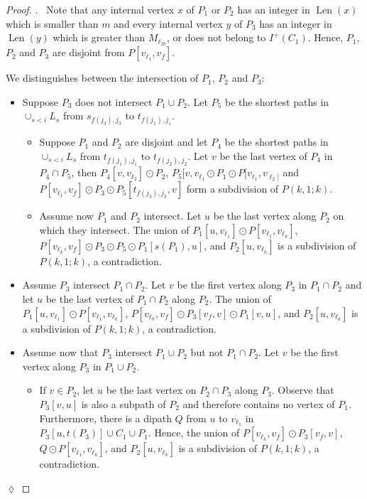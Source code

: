 \documentclass[utf8,10pt]{article}
\theoremstyle{plain}
\theoremstyle{definition}
\theoremstyle{remark}
\newenvironment{subproof}{\par\noindent {\it Subproof}.\ }{\hfill$\lozenge$\par\vspace{11pt}}
\DeclareMathOperator{\Len}{Len}
\begin{document}
\begin{proof}
\begin{subproof}
Note that any internal vertex $x$ of $P_1$ or $P_2$ has an integer in $\Len(x)$
which is smaller than $m$ and every internal vertex $y$ of $P_3$ has an integer in $\Len(y)$ which
is greater than $M_{\ell_{2k}}$, or does not belong to $I^+(C_1)$. Hence, 
$P_1$, $P_2$ and $P_3$ are disjoint from $P[v_{\ell_1},v_f]$. 

We distinguishes between the intersection of $P_1$, $P_2$ and $P_3$:

\begin{itemize}
	\item Suppose $P_3$ does not intersect $P_1 \cup P_2$. Let $P_5$ be the shortest paths in $\cup_{s < i} L_s$ from $s_{f(j_3),j_3}$ to $t_{f(j_1),j_1}$.
	\begin{itemize}
		\item Suppose $P_1$ and $P_2$ are disjoint and let $P_4$ be the shortest paths in $\cup_{s < i} L_s$ 
from $t_{f(j_1),j_1}$ to $t_{f(j_2),j_2}$. Let $v$ be the last vertex of $P_4$ in $P_4 \cap P_5$, then $P_4[v,v_{\ell_2}] \odot P_2$,
$P_5[v, v_{\ell_1} \odot P_1 \odot P[v_{\ell_1}, v_{\ell_2]}$ and $P[v_{\ell_1}, v_f] \odot P_3 \odot P_5[t_{f(j_3),j_3}, v]$
form a subdivision of $P(k,1;k)$.
	
		\item Assume now $P_1$ and $P_2$ intersect. Let $u$ be the last vertex along $P_2$ on which they intersect.
		 The union of $P_1[u,v_{\ell_1}]\odot P[v_{\ell_1}, v_{\ell_k}]$, $P[v_{\ell_k}, v_f]\odot P_3\odot P_5 \odot P_1[s(P_1), u]$, and $P_2[u, v_{\ell_k}]$ is a subdivision of $P(k,1;k)$, a contradiction.
	\end{itemize}

	\item Assume $P_3$ intersect $P_1\cap P_2$. Let $v$ be the first vertex along $P_3$ in $P_1\cap P_2$ and let $u$ be the last vertex of $P_1\cap P_2$ along $P_2$. The union of $P_1[u,v_{\ell_1}]\odot P[v_{\ell_1}, v_{\ell_k}]$, $P[v_{\ell_k}, v_f]\odot P_3[v_f,v]\odot P_1[v, u]$, and $P_2[u, v_{\ell_k}]$ is a subdivision of $P(k,1;k)$, a contradiction.

	\item Assume now that $P_3$ intersect $P_1\cup P_2$ but not $P_1\cap P_2$. Let $v$ be the first vertex along $P_3$ in $P_1\cup P_2$.
	\begin{itemize}
	\item If $v \in P_2$, let $u$ be the last vertex on $P_2\cap P_3$ along $P_3$. Observe that $P_3[v,u]$ is also a subpath of $P_2$ and therefore contains no vertex of $P_1$. Furthermore, there is a dipath $Q$ from $u$ to $v_{\ell_1}$ in $P_3[u, t(P_3)]\cup C_1\cup  P_1$. Hence, the union of $P[v_{\ell_k}, v_f] \odot P_3[v_f,v]$, $Q\odot P[v_{\ell_1},v_{\ell_k}]$, and $P_2[u,v_{\ell_k}]$ is a subdivision of $P(k,1;k)$, a contradiction.
	

\end{itemize}
\end{itemize}
\end{subproof}
\end{proof}
\end{document}

